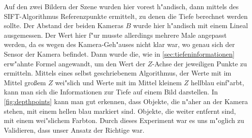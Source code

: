 \noindent Auf den zwei Bildern der Szene wurden hier vorest h"andisch, dann mittels des SIFT-Algorithmus Referenzpunkte ermittelt, zu denen die Tiefe berechnet werden sollte. Der Abstand der beiden Kameras $B$ wurde hier h"andisch mit einem Lineal ausgemessen. Der Wert hier f"ur musste allerdings mehrere Male angepasst werden, da es wegen des Kamera-Geh"auses nicht klar war, wo genau sich der Sensor der Kamera befindet.\newline
Dann wurde die, wie in \ref{sec:tiefeninformationen} erw"ahnte Formel angewandt, um den Wert der $Z$-Achse der jeweiligen Punkte zu ermitteln.\newline
Mittels eines selbst geschriebenem Algorithmus, der Werte mit im Mittel großem $Z$ wei"slich und Werte mit im Mittel kleinem $Z$ hellblau einf"arbt, kann man sich die Informationen zur Tiefe auf einem Bild darstellen.\newline
In \ref{fig:depthpoints} kann man gut erkennen, dass Objekte, die n"aher an der Kamera stehen, mit einem hellen blau markiert sind. Objekte, die weiter entfernt sind, mit einem wei"slichem Farbton. Durch dieses Experiment war es uns m"oglich zu Validieren, dass unser Ansatz der Richtige war.